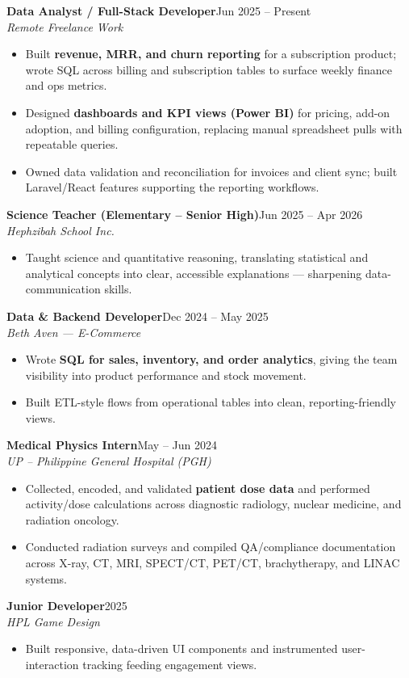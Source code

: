 \documentclass[10pt,letterpaper]{article}
\newcommand{\job}[3]{%
  \vspace{4pt}%
  {\bfseries #1}\hfill{\small\color{muted}#2}\\
  {\itshape #3}\par\vspace{1pt}%
}
\newenvironment{bullets}
  {\begin{itemize}[leftmargin=1.25em,itemsep=1pt,topsep=1pt,parsep=0pt,
     label=\textcolor{accent}{\footnotesize$\bullet$}]}
  {\end{itemize}}
\begin{document}
\job{Data Analyst / Full-Stack Developer}{Jun 2025 -- Present}{Remote Freelance Work}
\begin{bullets}
  \item Built \textbf{revenue, MRR, and churn reporting} for a subscription product; wrote SQL across billing and subscription tables to surface weekly finance and ops metrics.
  \item Designed \textbf{dashboards and KPI views (Power BI)} for pricing, add-on adoption, and billing configuration, replacing manual spreadsheet pulls with repeatable queries.
  \item Owned data validation and reconciliation for invoices and client sync; built Laravel/React features supporting the reporting workflows.
\end{bullets}

\job{Science Teacher (Elementary -- Senior High)}{Jun 2025 -- Apr 2026}{Hephzibah School Inc.}
\begin{bullets}
  \item Taught science and quantitative reasoning, translating statistical and analytical concepts into clear, accessible explanations --- sharpening data-communication skills.
\end{bullets}

\job{Data \& Backend Developer}{Dec 2024 -- May 2025}{Beth Aven --- E-Commerce}
\begin{bullets}
  \item Wrote \textbf{SQL for sales, inventory, and order analytics}, giving the team visibility into product performance and stock movement.
  \item Built ETL-style flows from operational tables into clean, reporting-friendly views.
\end{bullets}

\job{Medical Physics Intern}{May -- Jun 2024}{UP -- Philippine General Hospital (PGH)}
\begin{bullets}
  \item Collected, encoded, and validated \textbf{patient dose data} and performed activity/dose calculations across diagnostic radiology, nuclear medicine, and radiation oncology.
  \item Conducted radiation surveys and compiled QA/compliance documentation across X-ray, CT, MRI, SPECT/CT, PET/CT, brachytherapy, and LINAC systems.
\end{bullets}

\job{Junior Developer}{2025}{HPL Game Design}
\begin{bullets}
  \item Built responsive, data-driven UI components and instrumented user-interaction tracking feeding engagement views.
\end{bullets}
\end{document}
